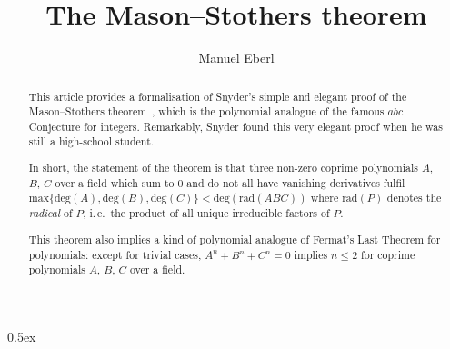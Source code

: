 \documentclass[11pt,a4paper]{article}
\begin{document}
\title{The Mason--Stothers theorem}
\author{Manuel Eberl}
\maketitle

\begin{abstract}
This article provides a formalisation of Snyder's simple and elegant proof of the Mason--Stothers theorem~\cite{snyder2000,lemmermeyer05}, which is the polynomial analogue of the famous $abc$ Conjecture for integers. Remarkably, Snyder found this very elegant proof when he was still a high-school student.

In short, the statement of the theorem is that three non-zero coprime polynomials $A$, $B$, $C$ over a field which sum to $0$ and do not all have vanishing derivatives fulfil $\textrm{max}\{\textrm{deg}(A),\textrm{deg}(B),\textrm{deg}(C)\} < \textrm{deg}(\textrm{rad}(ABC))$ where $\textrm{rad}(P)$ denotes the \emph{radical} of $P$, i.\,e.\ the product of all unique irreducible factors of $P$.

This theorem also implies a kind of polynomial analogue of Fermat's Last Theorem for polynomials: except for trivial cases, $A ^ n + B ^ n + C ^ n = 0$ implies $n \leq 2$ for coprime polynomials $A$, $B$, $C$ over a field.
\end{abstract}

\tableofcontents
\newpage

\parindent 0pt\parskip 0.5ex



\newpage


\end{document}
